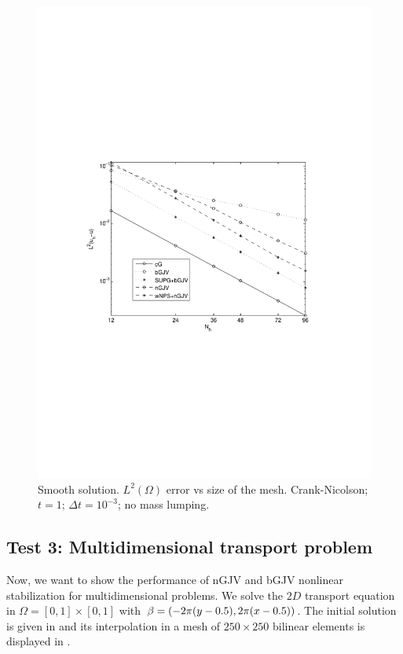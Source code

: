 \begin{figure}
\includegraphics[clip=true, trim=0cm 9cm 0cm 9cm,width=14cm]{Figures/paper1/smooth_conv_test_2D.pdf}%
 \caption{Smooth solution. $L^2(\Omega)$ error vs size of the mesh. Crank-Nicolson; $t=1$; $\Delta t = 10^{-3}$; no mass lumping.}\label{fig-smooth_sol}
 \end{figure}

\subsection{Test 3: Multidimensional transport problem} 
Now, we want to show the performance of nGJV and bGJV nonlinear stabilization for multidimensional problems. We solve the $2D$ transport equation  in $\Omega = [0,1]\times[0,1]$ with $\beta=(-2\pi (y-0.5), 2\pi (x-0.5))$. The initial solution is given in \cite{dmitri_kuzmin_guide_2010} and its interpolation in a mesh of $250\times250$ bilinear elements is displayed in . %
 

